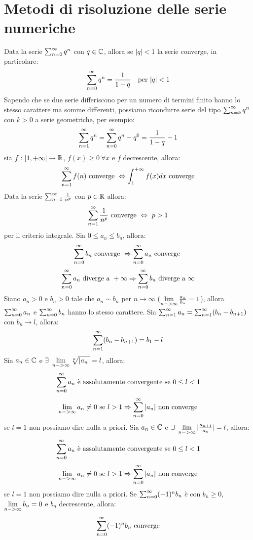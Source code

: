 \section{Metodi di risoluzione delle serie numeriche}
Data la serie $\sum_{n=0}^{\infty} q^n$ con $q \in \mathbb{C}$, allora se $|q|<1$ la serie converge, in particolare:
$$\sum_{n=0}^{\infty} q^n = \frac{1}{1-q} \quad \text{per } |q|<1$$
\oss
Sapendo che se due serie differiscono per un numero di termini finito hanno lo stesso carattere ma somme differenti, possiamo ricondurre serie del tipo $\sum_{n=k}^{\infty} q^n$ con $k>0$ a serie geometriche, per esempio:
$$\sum_{n=1}^{\infty} q^n = \sum_{n=0}^{\infty} q^n - q^0=\frac{1}{1-q}-1$$
sia $f:[1, +\infty]\rightarrow \mathbb{R}$, $f(x)\ge 0 \ \forall x$ e $f$ decrescente, allora:
$$\sum_{n=1}^{\infty} f(n) \text{ converge } \Leftrightarrow \int_1^{+\infty} f(x)dx \text{ converge}$$
Data la serie $\sum_{n=1}^{\infty} \frac{1}{n^p}$ con $p \in \mathbb{R}$ allora:
$$\sum_{n=1}^{\infty} \frac{1}{n^p} \text{ converge } \Leftrightarrow \ p>1$$
per il criterio integrale.
Sia $0 \leq a_n \leq b_n$, allora:
$$\sum_{n=0}^{\infty} b_n \text{ converge } \Rightarrow \sum_{n=0}^{\infty}a_n \text{ converge }$$
$$\sum_{n=0}^{\infty}a_n \text{ diverge a } +\infty \Rightarrow \sum_{n=0}^{\infty} b_n \text{ diverge a } \infty$$
Siano $a_n>0$ e $b_n > 0$ tale che $a_n \sim b_n$ per $n \rightarrow \infty$ ($\lim\limits_{n->\infty} \frac{a_n}{b_n}=1$), allora $\sum_{n=0}^{\infty}a_n$ e $\sum_{n=0}^{\infty} b_n$ hanno lo stesso carattere.
Sia $\sum_{n=1}^{\infty} a_n = \sum_{n=1}^{\infty} (b_n-b_{n+1})$ con $b_n \rightarrow l$, allora:
$$\sum_{n=1}^{\infty} (b_n-b_{n+1})=b_1-l$$
Sia $a_n \in \mathbb{C}$ e $\exists \ \lim\limits_{n->\infty} \sqrt[n]{|a_n|}=l$, allora:
$$\sum_{n=0}^{\infty}a_n \text{ è assolutamente convergente se } 0\le l< 1$$
$$\lim\limits_{n->\infty} a_n \ne 0 \text{ se } l>1 \Rightarrow \sum_{n=0}^{\infty}|a_n| \text{ non converge}$$
se $l=1$ non possiamo dire nulla a priori.
Sia $a_n \in \mathbb{C}$ e $\exists \ \liminff|\frac{a_{n+1}}{a_n}|=l$, allora:
$$\sum_{n=0}^{\infty}a_n \text{ è assolutamente convergente se } 0\le l< 1$$
$$\lim\limits_{n->\infty} a_n \ne 0 \text{ se } l>1 \Rightarrow \sum_{n=0}^{\infty}|a_n| \text{ non converge}$$
se $l=1$ non possiamo dire nulla a priori.
Se $\sum_{n=0}^{\infty} (-1)^n b_n$ è con $b_n \ge 0$, $\lim\limits_{n->\infty} b_n =0$ e $b_n$ decrescente, allora:
$$\sum_{n=0}^{\infty} (-1)^n b_n \text{ converge}$$
